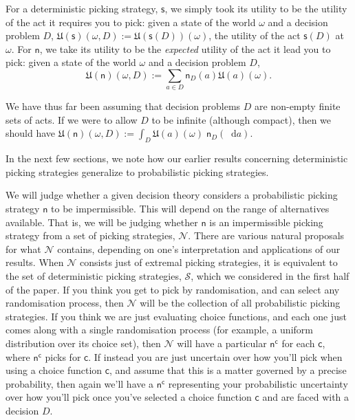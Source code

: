 \documentclass[a4paper,final]{article}
\newcommand\Exp{\mathsf{Exp}}
\newcommand\EU{\mathrm{EU}}
\newcommand\U{\mathfrak{U}} %
\renewcommand\S{\mathcal{S}}
\newcommand\s{\mathsf{s}}
\renewcommand\c{\mathsf{c}} %
\newcommand{\n}{\mathsf{n}}
\newcommand\Nu{\mathcal{N}}
\newcommand{\todoold}[2][]{\todo[backgroundcolor=white,bordercolor=orange!10,linecolor=gray!10, #1,caption={},textcolor=gray]{Pre-rev: #2}}
\newcommand{\todooldinfo}[2][]{\todoold[#1]{#2}}
\renewcommand{\color}[1]{}
\newenvironment{colored}[1]{\leavevmode\color{#1}}{}
\newcommand*\diff{\mathop{}\!\mathrm{d}}
\newenvironment{CCM rewritten}
{\begingroup\color{blue}} %
{\endgroup}              %
\begin{document}
For a deterministic picking strategy, $\s$, we simply took its utility to be the utility of the act it requires you to pick: given a state of the world $\omega$ and a decision problem $D$, $\U(\s)(\omega,D):=\U(\s(D))(\omega)$, the utility of the act $\s(D)$ at $\omega$. For $\n$, we take its utility to be the \emph{expected} utility of the act it lead you to pick: given a state of the world $\omega$ and a decision problem $D$, $$\U(\n)(\omega,D):=\sum_{a \in D} \n_D(a)\U(a)(\omega).$$

We have thus far been assuming that decision problems $D$ are non-empty finite sets of acts. If we were to allow $D$ to be infinite (although compact), then we should have $\U(\n)(\omega,D):=\int_{D} \U(a)(\omega)\; \n_D(\diff a)$.

In the next few sections, we note how our earlier results concerning deterministic
picking strategies generalize to probabilistic picking strategies.

We will judge whether a given decision theory considers a probabilistic picking strategy $\n$ to be impermissible. This will depend on the range of alternatives available. That is, we will be judging whether $\n$ is an impermissible picking strategy from a set of picking strategies, $\Nu$. 
There are various natural proposals for what $\Nu$ contains, depending on one's interpretation and applications of our results. 
When $\Nu$ consists just of extremal picking strategies, it is equivalent to the set of deterministic picking strategies, $\S$, which we considered in the first half of the paper. 
If you think you get to pick by randomisation, and can select any randomisation process, then $\Nu$ will be the collection of all probabilistic picking strategies.
If you think we are just evaluating choice functions, and each one just comes along with a single randomisation process (for example, a uniform distribution over its choice set), %
then $\Nu$ will have a particular $\n^\c$ for each $\c$, where $\n^\c$ picks for $\c$. 
If  instead you are just uncertain over how you'll pick when using a choice function $\c$, and assume that this is a matter governed by a precise probability, then again we'll have a $\n^\c$ representing your probabilistic uncertainty over how you'll pick once you've selected a choice function $\c$ and are faced with a decision $D$.
\end{document}
